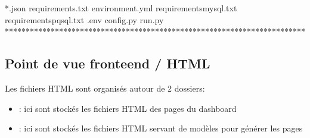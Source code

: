 \documentclass[letterpaper,10pt,french]{sphinxmanual}
\begin{document}
\begin{sphinxVerbatim}[commandchars=\\\{\}]
    \PYGZhy{}\PYGZhy{} *.json
\PYGZhy{}\PYGZhy{} requirements.txt                          
\PYGZhy{}\PYGZhy{} environment.yml                           
\PYGZhy{}\PYGZhy{} requirements\PYGZhy{}mysql.txt                    
\PYGZhy{}\PYGZhy{} requirements\PYGZhy{}pqsql.txt                    
\PYGZhy{}\PYGZhy{} .env                                      
\PYGZhy{}\PYGZhy{} config.py                                 
\PYGZhy{}\PYGZhy{} run.py                                    
\PYGZhy{}\PYGZhy{} ************************************************************************
\end{sphinxVerbatim}


\subsection{Point de vue fronte\sphinxhyphen{}end / HTML}
\label{\detokenize{infrastructure:point-de-vue-fronte-end-html}}
\sphinxAtStartPar
Les fichiers HTML sont organisés autour de 2 dossiers:
\begin{itemize}
\item {} 
\sphinxAtStartPar
{} : ici sont stockés les fichiers HTML des pages du dashboard

\item {} 
\sphinxAtStartPar
{} : ici sont stockés les fichiers HTML servant de modèles pour générer les pages

\end{itemize}
\end{document}
